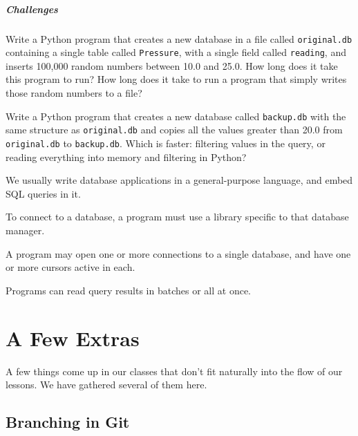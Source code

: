 \documentclass{book}
\begin{document}
\mbox{}\paragraph{Challenges}

\begin{swcenumerate}
\item
  Write a Python program that creates a new database in a file called
  \texttt{original.db} containing a single table called
  \texttt{Pressure}, with a single field called \texttt{reading}, and
  inserts 100,000 random numbers between 10.0 and 25.0. How long does it
  take this program to run? How long does it take to run a program that
  simply writes those random numbers to a file?
\item
  Write a Python program that creates a new database called
  \texttt{backup.db} with the same structure as \texttt{original.db} and
  copies all the values greater than 20.0 from \texttt{original.db} to
  \texttt{backup.db}. Which is faster: filtering values in the query, or
  reading everything into memory and filtering in Python?
\end{swcenumerate}

\begin{keypoints}
\begin{swcitemize}
\item
  We usually write database applications in a general-purpose language,
  and embed SQL queries in it.
\item
  To connect to a database, a program must use a library specific to
  that database manager.
\item
  A program may open one or more connections to a single database, and
  have one or more cursors active in each.
\item
  Programs can read query results in batches or all at once.
\end{swcitemize}
\end{keypoints}

\chapter{A Few Extras}\label{s:extras}

A few things come up in our classes that don't fit naturally into the
flow of our lessons. We have gathered several of them here.

\section{Branching in Git}
\end{document}

